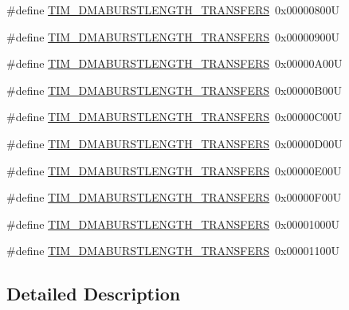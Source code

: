 \begin{DoxyCompactItemize}
\#define \mbox{\hyperlink{group___t_i_m___d_m_a___burst___length_ga73fff75a3f0247c61a84a42e8cb83572}{T\+I\+M\+\_\+\+D\+M\+A\+B\+U\+R\+S\+T\+L\+E\+N\+G\+T\+H\+\_\+T\+R\+A\+N\+S\+F\+E\+RS}}~0x00000800U
\item 
\#define \mbox{\hyperlink{group___t_i_m___d_m_a___burst___length_ga793a89bb8a0669e274de451985186c53}{T\+I\+M\+\_\+\+D\+M\+A\+B\+U\+R\+S\+T\+L\+E\+N\+G\+T\+H\+\_\+T\+R\+A\+N\+S\+F\+E\+RS}}~0x00000900U
\item 
\#define \mbox{\hyperlink{group___t_i_m___d_m_a___burst___length_ga79ab58b6a3b30c54c0758b381df22cb0}{T\+I\+M\+\_\+\+D\+M\+A\+B\+U\+R\+S\+T\+L\+E\+N\+G\+T\+H\+\_\+T\+R\+A\+N\+S\+F\+E\+RS}}~0x00000\+A00U
\item 
\#define \mbox{\hyperlink{group___t_i_m___d_m_a___burst___length_gaf52962b501b3a76d89df6274ed425947}{T\+I\+M\+\_\+\+D\+M\+A\+B\+U\+R\+S\+T\+L\+E\+N\+G\+T\+H\+\_\+T\+R\+A\+N\+S\+F\+E\+RS}}~0x00000\+B00U
\item 
\#define \mbox{\hyperlink{group___t_i_m___d_m_a___burst___length_ga06a81eba628bea6495d86ebcc6021da0}{T\+I\+M\+\_\+\+D\+M\+A\+B\+U\+R\+S\+T\+L\+E\+N\+G\+T\+H\+\_\+T\+R\+A\+N\+S\+F\+E\+RS}}~0x00000\+C00U
\item 
\#define \mbox{\hyperlink{group___t_i_m___d_m_a___burst___length_ga5f430b76c0aeded0a8d8be779f26ae52}{T\+I\+M\+\_\+\+D\+M\+A\+B\+U\+R\+S\+T\+L\+E\+N\+G\+T\+H\+\_\+T\+R\+A\+N\+S\+F\+E\+RS}}~0x00000\+D00U
\item 
\#define \mbox{\hyperlink{group___t_i_m___d_m_a___burst___length_ga98a4d88c533178bc1b4347e4c5ce815a}{T\+I\+M\+\_\+\+D\+M\+A\+B\+U\+R\+S\+T\+L\+E\+N\+G\+T\+H\+\_\+T\+R\+A\+N\+S\+F\+E\+RS}}~0x00000\+E00U
\item 
\#define \mbox{\hyperlink{group___t_i_m___d_m_a___burst___length_gaf4b2a1fe12c52272544c21e17de1ed90}{T\+I\+M\+\_\+\+D\+M\+A\+B\+U\+R\+S\+T\+L\+E\+N\+G\+T\+H\+\_\+T\+R\+A\+N\+S\+F\+E\+RS}}~0x00000\+F00U
\item 
\#define \mbox{\hyperlink{group___t_i_m___d_m_a___burst___length_gad31c1fca7ed436a53efc4f290144584d}{T\+I\+M\+\_\+\+D\+M\+A\+B\+U\+R\+S\+T\+L\+E\+N\+G\+T\+H\+\_\+T\+R\+A\+N\+S\+F\+E\+RS}}~0x00001000U
\item 
\#define \mbox{\hyperlink{group___t_i_m___d_m_a___burst___length_gabb6f72b02ee1c8855de241cb0713e2ca}{T\+I\+M\+\_\+\+D\+M\+A\+B\+U\+R\+S\+T\+L\+E\+N\+G\+T\+H\+\_\+T\+R\+A\+N\+S\+F\+E\+RS}}~0x00001100U
\end{DoxyCompactItemize}


\subsection{Detailed Description}


